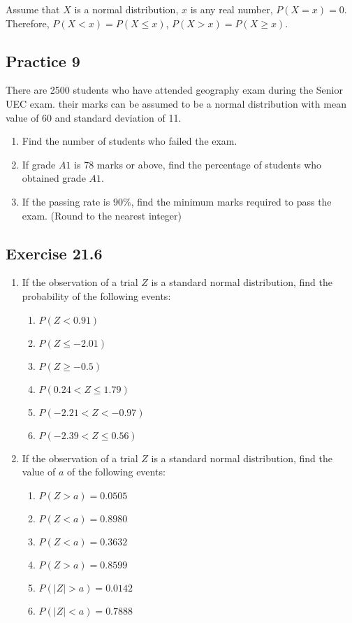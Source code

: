 \documentclass{report}
\begin{document}
\begin{multicols}{2}
  Assume that $X$ is a normal distribution, $x$ is any real number, $P(X=x) = 0$.
  Therefore, $P(X < x) = P(X \leq x)$, $P(X > x) = P(X \geq x)$.

  \subsection{Practice 9}

  There are 2500 students who have attended geography exam during the Senior UEC
  exam. their marks can be assumed to be a normal distribution with mean value of
  60 and standard deviation of 11.
  \begin{enumerate}[label=(\alph*)]
    \item Find the number of students who failed the exam.
    \item If grade $A1$ is 78 marks or above, find the percentage of students who
          obtained grade $A1$.
    \item If the passing rate is $90\%$, find the minimum marks required to pass the
          exam. (Round to the nearest integer)
  \end{enumerate}

  \subsection{Exercise 21.6}

  \begin{enumerate}
    \item If the observation of a trial $Z$ is a standard normal distribution, find the
          probability of the following events:
          \begin{enumerate}
            \item $P(Z < 0.91)$
            \item $P(Z \leq -2.01)$
            \item $P(Z \geq -0.5)$
            \item $P(0.24 < Z \leq 1.79)$
            \item $P(-2.21 < Z < -0.97)$
            \item $P(-2.39 < Z \leq 0.56)$
          \end{enumerate}

    \item If the observation of a trial $Z$ is a standard normal distribution, find the
          value of $a$ of the following events:
          \begin{enumerate}
            \item $P(Z > a) = 0.0505$
            \item $P(Z < a) = 0.8980$
            \item $P(Z < a) = 0.3632$
            \item $P(Z > a) = 0.8599$
            \item $P(|Z| > a) = 0.0142$
            \item $P(|Z| < a) = 0.7888$
          \end{enumerate}


\end{enumerate}
\end{multicols}
\end{document}
